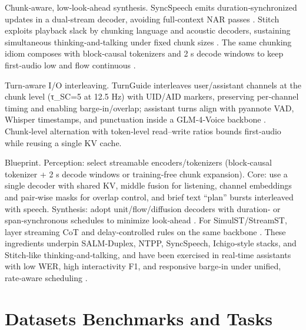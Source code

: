 \documentclass{article}
\begin{document}
Chunk‑aware, low‑look‑ahead synthesis. SyncSpeech emits duration‑synchronized updates in a dual‑stream decoder, avoiding full‑context NAR passes \cite{sheng2025syncspeechlowlatencyefficientdualstreamt}. Stitch exploits playback slack by chunking language and acoustic decoders, sustaining simultaneous thinking‑and‑talking under fixed chunk sizes \cite{chiang2025stitchsimultaneousthinkingtalkingchunked}. The same chunking idiom composes with block‑causal tokenizers and 2 s decode windows to keep first‑audio low and flow continuous \cite{zeng2024scalingspeechtextpretrainingsyntheticint}.

Turn‑aware I/O interleaving. TurnGuide interleaves user/assistant channels at the chunk level (τ_SC=5 at 12.5 Hz) with UID/AID markers, preserving per‑channel timing and enabling barge‑in/overlap; assistant turns align with pyannote VAD, Whisper timestamps, and punctuation inside a GLM‑4‑Voice backbone \cite{cui2025thinkbeforeyoutalkenhancingmeaningfuldia}. Chunk‑level alternation with token‑level read–write ratios bounds first‑audio while reusing a single KV cache.

Blueprint. Perception: select streamable encoders/tokenizers (block‑causal tokenizer + 2 s decode windows or training‑free chunk expansion). Core: use a single decoder with shared KV, middle fusion for listening, channel embeddings and pair‑wise masks for overlap control, and brief text “plan” bursts interleaved with speech. Synthesis: adopt unit/flow/diffusion decoders with duration‑ or span‑synchronous schedules to minimize look‑ahead \cite{sheng2025syncspeechlowlatencyefficientdualstreamt}. For SimulST/StreamST, layer streaming CoT and delay‑controlled rules on the same backbone \cite{guo2025streamuniachievingstreamingspeechtransla}. These ingredients underpin SALM‑Duplex, NTPP, SyncSpeech, Ichigo‑style stacks, and Stitch‑like thinking‑and‑talking, and have been exercised in real‑time assistants with low WER, high interactivity F1, and responsive barge‑in under unified, rate‑aware scheduling \cite{ma2024languagemodelcanlistenwhilespeaking,hu2025salmduplexefficientdirectmodelingspeechl,wang2025ntppgenerativespeechlanguagemodelingdual,chiang2025stitchsimultaneousthinkingtalkingchunked,zeng2024scalingspeechtextpretrainingsyntheticint}.









\section{Datasets Benchmarks and Tasks} \label{sec:Datasets Benchmarks and Tasks}
\end{document}
